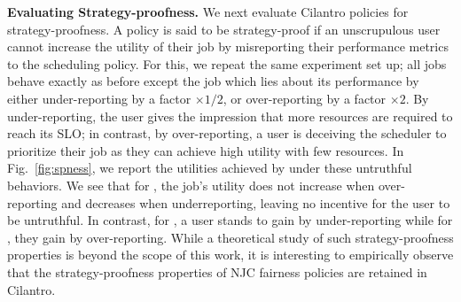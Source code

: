 \textbf{Evaluating Strategy-proofness.}
We next evaluate Cilantro policies for strategy-proofness.
A policy is said to be strategy-proof if an unscrupulous user cannot increase the
utility of their job by misreporting their performance metrics to the scheduling
policy.
% 
For this, we repeat the same experiment set up; all jobs behave exactly as before except the  job which lies about its performance
by either under-reporting by a factor $\times 1/2$,
or over-reporting  by a factor $\times 2$.
By under-reporting, the user
gives the impression that more resources are required to reach its SLO;
in contrast, by over-reporting, a user is deceiving the scheduler to
prioritize their job as
they can achieve high utility with few resources.
% 
In Fig.~\ref{fig:spness},
we report the utilities achieved by  under these untruthful behaviors.
We see that for \cilantronjc, the job's utility does not increase when over-reporting
and decreases when underreporting, leaving no incentive for the user to be untruthful.
In contrast,  for \cilantroew, a user stands to gain by under-reporting
while for \cilantrosw, they gain by over-reporting.
While a theoretical study of such strategy-proofness properties is beyond the scope of this work,
it is interesting to empirically observe that the strategy-proofness properties of NJC fairness
policies are retained in Cilantro.%

